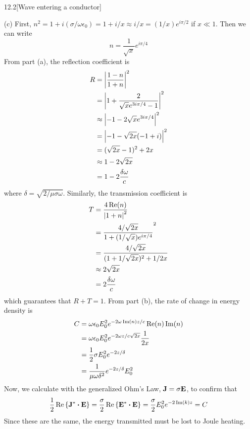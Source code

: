 \documentclass[12pt]{article}
\begin{document}
\begin{problem}{12.2}[Wave entering a conductor]
\begin{solution}
(c) First, $n^2=1+i(\sigma/\omega\epsilon_0)=1+i/x\approx
i/x=(1/x)e^{i\pi/2}$ if $x\ll 1$. Then we can write
\begin{equation}
    n=\frac1{\sqrt{x}}e^{i\pi/4} 
\end{equation}
From part (a), the reflection coefficient is
\begin{align}
    R&=\abs{\frac{1-n}{1+n}}^2\notag\\
     &=\abs{1+\frac2{\sqrt{x}e^{3i\pi/4}-1}}^2\notag\\
     &\approx\abs{-1-2\sqrt{x}e^{3i\pi/4}}^2\notag\\
     &=\abs{-1-\sqrt{2x}(-1+i)}^2\notag\\
     &=(\sqrt{2x}-1)^2+2x\notag\\
     &\approx1-2\sqrt{2x}\notag\\
     &=1-2\frac{\delta\omega}{c}
\end{align}
where $\delta=\sqrt{2/\mu\sigma\omega}$. Similarly, the transmission coefficient
is
\begin{align}
    T&=\frac{4\Re(n)}{\abs{1+n}^2}\notag\\
     &=\frac{4/\sqrt{2x}}{1+(1/\sqrt{x})e^{i\pi/4}}^2\notag\\
     &=\frac{4/\sqrt{2x}}{(1+1/\sqrt{2x})^2+1/2x}\notag\\
     &\approx2\sqrt{2x}\notag\\
     &=2\frac{\delta\omega}{c}
\end{align}
which guarantees that $R+T=1$. From part (b), the rate of change in energy
density is
\begin{align}
    C&=\omega\epsilon_0E_0^2e^{-2\omega \Im(n)z/c}\Re(n)\Im(n) \notag\\
     &=\omega\epsilon_0E_0^2e^{-2\omega z/c\sqrt{2x}}\frac1{2x}\notag\\
     &=\frac12\sigma E_0^2e^{-2z/\delta}\notag\\
     &=\frac{1}{\mu\omega\delta^2}e^{-2z/\delta}E_0^2
\end{align}
Now, we calculate with the generalized Ohm's Law,
$\vb{J}=\sigma\vb{E}$, to confirm that
\begin{align}
    \frac12\Re\qty{\vb{J}^\ast\vdot\vb{E}} 
    =\frac{\sigma}{2}\Re\qty{\vb{E}^\ast\vdot\vb{E}}
    =\frac{\sigma}{2}E_0^2e^{-2\Im(k)z}
    =C
\end{align}
Since these are the same, the energy transmitted must be lost to Joule heating.
\end{solution}
\end{problem}
\end{document}
